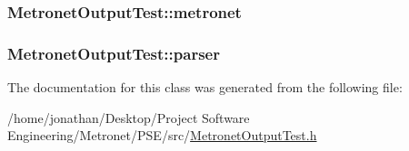 \subsubsection[{\texorpdfstring{metronet}{metronet}}]{ Metronet\+Output\+Test\+::metronet\hspace{0.3cm}{\ttfamily [protected]}}\hypertarget{class_metronet_output_test_aaa6f34ee762d128cd8aea8c895bb46e4}{}\label{class_metronet_output_test_aaa6f34ee762d128cd8aea8c895bb46e4}
\subsubsection[{\texorpdfstring{parser}{parser}}]{ Metronet\+Output\+Test\+::parser\hspace{0.3cm}{\ttfamily [protected]}}\hypertarget{class_metronet_output_test_a0ed101661d80432a33bb81fed2621029}{}\label{class_metronet_output_test_a0ed101661d80432a33bb81fed2621029}


The documentation for this class was generated from the following file\+:\begin{DoxyCompactItemize}
\item 
/home/jonathan/\+Desktop/\+Project Software Engineering/\+Metronet/\+P\+S\+E/src/\hyperlink{_metronet_output_test_8h}{Metronet\+Output\+Test.\+h}\end{DoxyCompactItemize}
